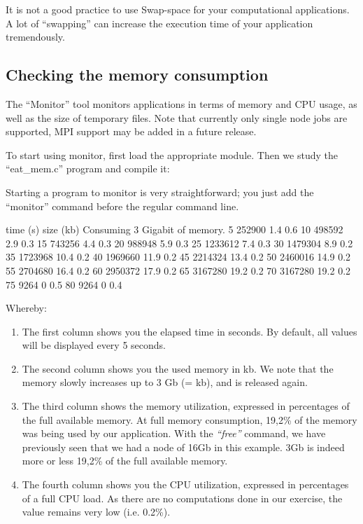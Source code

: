 It is not a good practice to use Swap-space for your computational
applications. A lot of ``swapping'' can increase the execution time of your
application tremendously.

\subsection{Checking the memory consumption}

The ``Monitor'' tool monitors applications in terms of memory and CPU usage, as
well as the size of temporary files. Note that currently only single node jobs
are supported, MPI support may be added in a future release.

To start using monitor, first load the appropriate module. Then we study the
``eat\_mem.c'' program and compile it:

\begin{prompt}
\end{prompt}


Starting a program to monitor is very straightforward; you just add the
``monitor'' command before the regular command line.

\begin{prompt}
time (s) size (kb) %
Consuming 3 Gigabit of memory.
5  252900 1.4 0.6
10  498592 2.9 0.3
15  743256 4.4 0.3
20  988948 5.9 0.3
25  1233612 7.4 0.3
30  1479304 8.9 0.2
35  1723968 10.4 0.2
40  1969660 11.9 0.2
45  2214324 13.4 0.2
50  2460016 14.9 0.2
55  2704680 16.4 0.2
60  2950372 17.9 0.2
65  3167280 19.2 0.2
70  3167280 19.2 0.2
75  9264  0 0.5
80  9264  0 0.4
\end{prompt}

Whereby:

\begin{enumerate}
\item  The first column shows you the elapsed time in seconds. By default, all
  values will be displayed every 5 seconds.
\item  The second column shows you the used memory in kb. We note that the
  memory slowly increases up to 3 Gb (=  kb), and is released again.
\item  The third column shows the memory utilization, expressed in percentages
  of the full available memory.  At full memory consumption, 19,2\% of the
  memory was being used by our application. With the \emph{``free''} command,
  we have previously seen that we had a node of 16Gb in this example. 3Gb is
  indeed more or less 19,2\% of the full available memory.
\item  The fourth column shows you the CPU utilization, expressed in
  percentages of a full CPU load. As there are no computations done in our
  exercise, the value remains very low (i.e. 0.2\%).
\end{enumerate}

